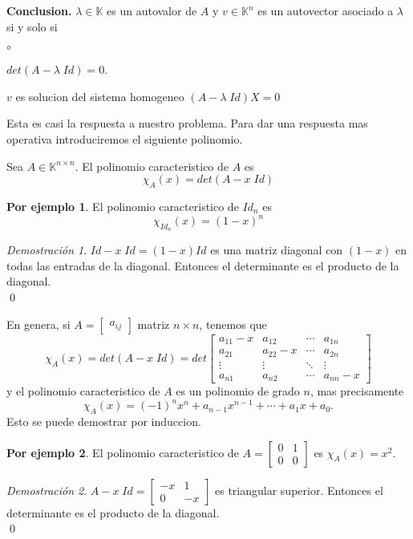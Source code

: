 \documentclass{article}
\theoremstyle{definition}
\theoremstyle{definition}
\newtheorem*{ej}{Por ejemplo}
\theoremstyle{remark}
\newtheorem*{demo}{Demostración}
\begin{document}
\textbf{Conclusion.} $\lambda \in \mathbb{K}$ es un autovalor de $A$ y $v \in \mathbb{K}^n$ es un autovector asociado a $\lambda$ si y solo si  \begin{list}{$\circ$}{}  
\item $det(A - \lambda \; Id)=0$. 
\item $v$ es solucion del sistema homogeneo $(A-\lambda \; Id)X=0$
\end{list}
Esta es casi la respuesta a nuestro problema. Para dar una respuesta mas operativa introduciremos el siguiente polinomio.
\pagebreak

\begin{defi}
  Sea $A \in \mathbb{K}^{n \times n}$. El polinomio caracteristico de $A$ es \[
\chi_A (x)=det(A-x \;Id) 
  \]
\end{defi}
\begin{ej}
  El polinomio caracteristico de $Id_n$ es \[
  \chi_{Id_n} (x) = (1-x)^n  \]
\end{ej}
\begin{demo}
  $Id-x\;Id=(1-x)Id$ es una matriz diagonal con $(1-x)$ en todas las entradas de la diagonal. Entonces el determinante es el producto de la diagonal. \\ \qed
\end{demo}
En genera, si $A=\begin{bmatrix}a_{ij}\end{bmatrix}$ matriz $n \times n$, tenemos que \[
\chi_A(x)=det(A-x \; Id)=det\begin{bmatrix} 
  a_{11}-x & a_{12} & \cdots & a_{1n} \\ 
  a_{21} & a_{22}-x & \cdots & a_{2n} \\
  \vdots & \vdots & \ddots & \vdots \\
  a_{n1} & a_{n2} & \cdots & a_{nn}-x
\end{bmatrix}
\]
y el polinomio caracteristico de $A$ es un polinomio de grado $n$, mas precisamente \[
  \chi_A(x)=(-1)^nx^n+a_{n-1}x^{n-1}+ \cdots + a_{1}x + a_0.
\]
Esto se puede demostrar por induccion.
\begin{ej}
  El polinomio caracteristico de $A= \begin{bmatrix} 0 & 1 \\ 0 & 0 \end{bmatrix}$ es $\chi_A(x)=x^2$.
\end{ej}
\begin{demo}
  $A-x\; Id=\begin{bmatrix} - x & 1 \\ 0 & -x \end{bmatrix}$ es triangular superior. Entonces el determinante es el producto de la diagonal. \\ \qed
\end{demo}
\end{document}
